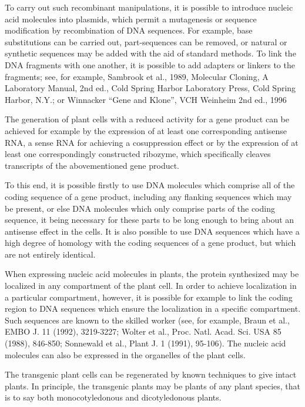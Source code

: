\documentclass[11pt,a4paper]{article}
\begin{document}
To carry out such recombinant manipulations, it is possible to introduce nucleic acid molecules into plasmids, which permit a mutagenesis or sequence modification by recombination of DNA sequences. For example, base substitutions can be carried out, part-sequences can be removed, or natural or synthetic sequences may be added with the aid of standard methods. To link the DNA fragments with one another, it is possible to add adapters or linkers to the fragments; see, for example, Sambrook et al., 1989, Molecular Cloning, A Laboratory Manual, 2nd ed., Cold Spring Harbor Laboratory Press, Cold Spring Harbor, N.Y.; or Winnacker “Gene and Klone”, VCH Weinheim 2nd ed., 1996

The generation of plant cells with a reduced activity for a gene product can be achieved for example by the expression of at least one corresponding antisense RNA, a sense RNA for achieving a cosuppression effect or by the expression of at least one correspondingly constructed ribozyme, which specifically cleaves transcripts of the abovementioned gene product.

To this end, it is possible firstly to use DNA molecules which comprise all of the coding sequence of a gene product, including any flanking sequences which may be present, or else DNA molecules which only comprise parts of the coding sequence, it being necessary for these parts to be long enough to bring about an antisense effect in the cells. It is also possible to use DNA sequences which have a high degree of homology with the coding sequences of a gene product, but which are not entirely identical.

When expressing nucleic acid molecules in plants, the protein synthesized may be localized in any compartment of the plant cell. In order to achieve localization in a particular compartment, however, it is possible for example to link the coding region to DNA sequences which ensure the localization in a specific compartment. Such sequences are known to the skilled worker (see, for example, Braun et al., EMBO J. 11 (1992), 3219-3227; Wolter et al., Proc. Natl. Acad. Sci. USA 85 (1988), 846-850; Sonnewald et al., Plant J. 1 (1991), 95-106). The nucleic acid molecules can also be expressed in the organelles of the plant cells.

The transgenic plant cells can be regenerated by known techniques to give intact plants. In principle, the transgenic plants may be plants of any plant species, that is to say both monocotyledonous and dicotyledonous plants.
\end{document}
